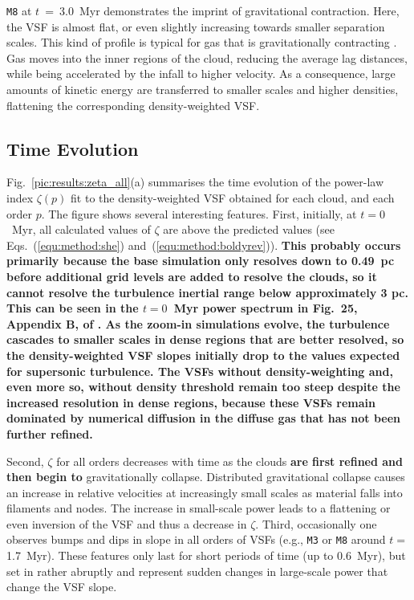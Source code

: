 \texttt{M8} at $t$~=~3.0~Myr demonstrates the imprint of gravitational contraction.
Here, the VSF is almost flat, or even slightly increasing towards smaller separation scales. 
This kind of profile is typical for gas that is gravitationally contracting \citep{Boneberg2015,Burkhart2015}.
Gas moves into the inner regions of the cloud, reducing the average lag distances, while being accelerated by the infall to higher velocity.
As a consequence, large amounts of kinetic energy are transferred to smaller scales and higher densities, flattening the corresponding density-weighted VSF.

\subsection{Time Evolution}\label{results:normal}

Fig.~\ref{pic:results:zeta_all}(a) summarises the time evolution of the power-law index $\zeta(p)$ fit to the density-weighted VSF obtained for each cloud, and each order $p$.
The figure shows several interesting features.
First, initially, at $t=0$~Myr, all calculated values of $\zeta$ are above the predicted values (see Eqs.~(\ref{equ:method:she}) and~(\ref{equ:method:boldyrev})).
\textbf{
    This  probably occurs primarily because the base simulation only resolves down to 0.49~pc before additional grid levels are added to resolve the clouds, so it cannot resolve the turbulence inertial range below approximately 3 pc.
    This can be seen in the $t=0$~Myr power spectrum in Fig.~25, Appendix B, of . 
    As the zoom-in simulations evolve, the turbulence cascades to smaller scales in dense regions that are better resolved, so the density-weighted VSF slopes initially drop to the values expected for supersonic turbulence. 
    The VSFs without density-weighting and, even more so, without density threshold remain too steep despite the increased resolution in dense regions, because these VSFs remain dominated by numerical diffusion in the diffuse gas that has not been further refined.
}

Second, $\zeta$ for all orders decreases with time as the clouds
\textbf{are first refined and then begin to}
gravitationally collapse. Distributed gravitational collapse causes an increase in relative velocities at increasingly small scales as material falls into filaments and nodes.  The increase in small-scale power leads to a flattening or even inversion of the VSF and thus a decrease in $\zeta$.
Third, occasionally one observes bumps and dips in slope in all orders of VSFs (e.g., \texttt{M3} or \texttt{M8} around $t=$1.7~Myr). 
These features only last for short periods of time (up to 0.6~Myr), but set in rather abruptly and represent sudden changes in large-scale power that change the VSF slope. 


